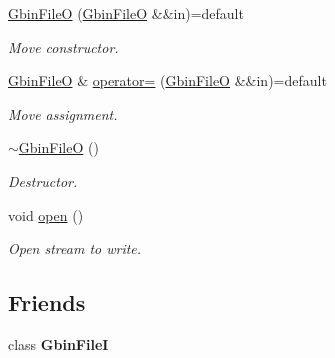 \begin{DoxyCompactItemize}
\hyperlink{classsamp_files_1_1_gbin_file_o_a01ffd02d1ed7fd456bf3168e26f7ba3f}{Gbin\+FileO} (\hyperlink{classsamp_files_1_1_gbin_file_o}{Gbin\+FileO} \&\&in)=default
\begin{DoxyCompactList}\small\item\em Move constructor. \end{DoxyCompactList}\item 
\mbox{\label{classsamp_files_1_1_gbin_file_o_a99f00b2164156c1427a91c3bcbc64605}} 
\hyperlink{classsamp_files_1_1_gbin_file_o}{Gbin\+FileO} \& \hyperlink{classsamp_files_1_1_gbin_file_o_a99f00b2164156c1427a91c3bcbc64605}{operator=} (\hyperlink{classsamp_files_1_1_gbin_file_o}{Gbin\+FileO} \&\&in)=default
\begin{DoxyCompactList}\small\item\em Move assignment. \end{DoxyCompactList}\item 
\mbox{\label{classsamp_files_1_1_gbin_file_o_adaeea3215e02bbc94cd1ce71d47af95a}} 
\hyperlink{classsamp_files_1_1_gbin_file_o_adaeea3215e02bbc94cd1ce71d47af95a}{$\sim$\+Gbin\+FileO} ()
\begin{DoxyCompactList}\small\item\em Destructor. \end{DoxyCompactList}\item 
\mbox{\label{classsamp_files_1_1_gbin_file_o_a9970e6174a76074e1c634baf58b1e6db}} 
void \hyperlink{classsamp_files_1_1_gbin_file_o_a9970e6174a76074e1c634baf58b1e6db}{open} ()
\begin{DoxyCompactList}\small\item\em Open stream to write. \end{DoxyCompactList}\end{DoxyCompactItemize}
\subsection*{Friends}
\begin{DoxyCompactItemize}
\item 
\mbox{\label{classsamp_files_1_1_gbin_file_o_a956102d1fcb7924e5b783942f6cc023c}} 
class {\bfseries Gbin\+FileI}
\end{DoxyCompactItemize}
